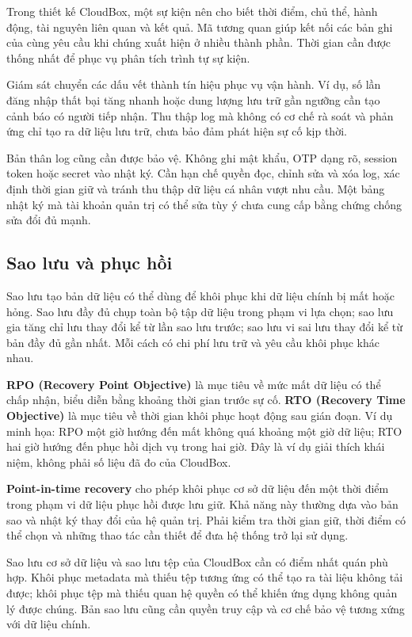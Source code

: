 Trong thiết kế CloudBox, một sự kiện nên cho biết thời điểm, chủ thể, hành động, tài nguyên liên quan và kết quả. Mã tương quan giúp kết nối các bản ghi của cùng yêu cầu khi chúng xuất hiện ở nhiều thành phần. Thời gian cần được thống nhất để phục vụ phân tích trình tự sự kiện.

Giám sát chuyển các dấu vết thành tín hiệu phục vụ vận hành. Ví dụ, số lần đăng nhập thất bại tăng nhanh hoặc dung lượng lưu trữ gần ngưỡng cần tạo cảnh báo có người tiếp nhận. Thu thập log mà không có cơ chế rà soát và phản ứng chỉ tạo ra dữ liệu lưu trữ, chưa bảo đảm phát hiện sự cố kịp thời.

Bản thân log cũng cần được bảo vệ. Không ghi mật khẩu, OTP dạng rõ, session token hoặc secret vào nhật ký. Cần hạn chế quyền đọc, chỉnh sửa và xóa log, xác định thời gian giữ và tránh thu thập dữ liệu cá nhân vượt nhu cầu. Một bảng nhật ký mà tài khoản quản trị có thể sửa tùy ý chưa cung cấp bằng chứng chống sửa đổi đủ mạnh.

\subsection{Sao lưu và phục hồi}
Sao lưu tạo bản dữ liệu có thể dùng để khôi phục khi dữ liệu chính bị mất hoặc hỏng. Sao lưu đầy đủ chụp toàn bộ tập dữ liệu trong phạm vi lựa chọn; sao lưu gia tăng chỉ lưu thay đổi kể từ lần sao lưu trước; sao lưu vi sai lưu thay đổi kể từ bản đầy đủ gần nhất. Mỗi cách có chi phí lưu trữ và yêu cầu khôi phục khác nhau.

\textbf{RPO (Recovery Point Objective)} là mục tiêu về mức mất dữ liệu có thể chấp nhận, biểu diễn bằng khoảng thời gian trước sự cố. \textbf{RTO (Recovery Time Objective)} là mục tiêu về thời gian khôi phục hoạt động sau gián đoạn. Ví dụ minh họa: RPO một giờ hướng đến mất không quá khoảng một giờ dữ liệu; RTO hai giờ hướng đến phục hồi dịch vụ trong hai giờ. Đây là ví dụ giải thích khái niệm, không phải số liệu đã đo của CloudBox.

\textbf{Point-in-time recovery} cho phép khôi phục cơ sở dữ liệu đến một thời điểm trong phạm vi dữ liệu phục hồi được lưu giữ. Khả năng này thường dựa vào bản sao và nhật ký thay đổi của hệ quản trị. Phải kiểm tra thời gian giữ, thời điểm có thể chọn và những thao tác cần thiết để đưa hệ thống trở lại sử dụng.

Sao lưu cơ sở dữ liệu và sao lưu tệp của CloudBox cần có điểm nhất quán phù hợp. Khôi phục metadata mà thiếu tệp tương ứng có thể tạo ra tài liệu không tải được; khôi phục tệp mà thiếu quan hệ quyền có thể khiến ứng dụng không quản lý được chúng. Bản sao lưu cũng cần quyền truy cập và cơ chế bảo vệ tương xứng với dữ liệu chính.

